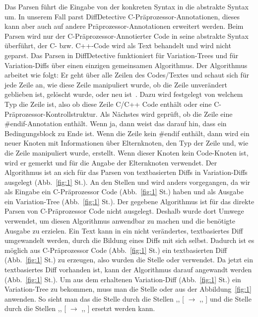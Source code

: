 Das Parsen führt die Eingabe von der konkreten Syntax in die abstrakte Syntax um. In unserem Fall parst DiffDetective  C-Präprozessor-Annotationen, dieses kann aber auch auf andere Präprozessor-Annotationen erweitert werden. Beim Parsen wird nur der C-Präprozessor-Annotierter Code in seine abstrakte Syntax überführt, der C- bzw. C++-Code wird als Text behandelt und wird nicht geparst. Das Parsen in DiffDetective funktioniert für Variation-Trees und für Variation-Diffs über einen einzigen gemeinsamen Algorithmus. Der Algorithmus arbeitet wie folgt: Er geht über alle Zeilen des Codes/Textes und schaut sich für jede Zeile an, wie diese Zeile manipuliert wurde, ob die Zeile unverändert geblieben ist, gelöscht wurde, oder neu ist~\cite{Viegener21}. Dazu wird festgelegt von welchem Typ die Zeile ist, also ob diese Zeile C/C++ Code enthält oder eine C-Präprozessor-Kontrollstruktur. Als Nächstes wird geprüft, ob die Zeile eine \#endif-Annotation enthält. Wenn ja, dann weist das darauf hin, dass ein Bedingungsblock zu Ende ist. Wenn die Zeile kein \#endif enthält, dann wird ein neuer Knoten mit Informationen über Elternknoten, den Typ der Zeile und, wie die Zeile manipuliert wurde, erstellt. Wenn dieser Knoten kein Code-Knoten ist, wird er gemerkt und für die Angabe der Elternknoten verwendet. Der Algorithmus ist an sich für das Parsen von textbasierten Diffs in Variation-Diffs ausgelegt (Abb.~\ref{fig:1} St.). An den Stellen  und  wird anders vorgegangen, da wir als Eingabe ein C-Präprozessor Code (Abb.~\ref{fig:1} St.) haben und als Ausgabe ein Variation-Tree (Abb.~\ref{fig:1} St.). Der gegebene Algorithmus ist für das direkte Parsen von C-Präprozessor Code nicht ausgelegt. Deshalb wurde dort Umwege verwendet, um diesen Algorithmus anwendbar zu machen und die benötigte Ausgabe zu erzielen. Ein Text kann in ein nicht verändertes, textbasiertes Diff umgewandelt werden, durch die Bildung eines Diffs mit sich selbst. Dadurch ist es möglich aus C-Präprozessor Code (Abb.~\ref{fig:1} St.) ein textbasierten Diff (Abb.~\ref{fig:1} St.) zu erzeugen, also wurden die Stelle  oder  verwendet. Da jetzt ein textbasiertes Diff vorhanden ist, kann der Algorithmus darauf angewandt werden (Abb.~\ref{fig:1} St.). Um aus dem erhaltenen Variation-Diff (Abb.~\ref{fig:1} St.) ein Variation-Tree zu bekommen, muss man die Stelle  oder  aus der Abbildung~\ref{fig:1} anwenden. So sieht man das die Stelle  durch die Stellen ,, [  $\rightarrow$ ,, ] und die Stelle  durch die Stellen ,, [  $\rightarrow$ ,, ] ersetzt werden kann.



